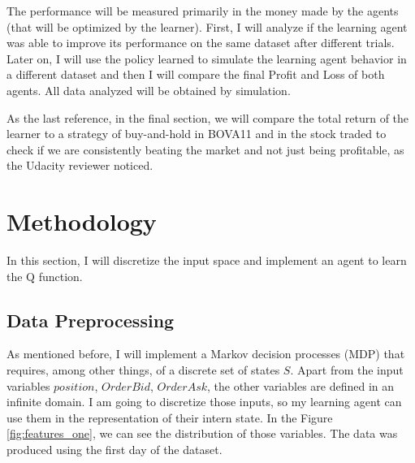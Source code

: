 \documentclass[a4paper]{article}
\begin{document}
The performance will be measured primarily in the money made by the agents (that will be optimized by the learner). First, I will analyze if the learning agent was able to improve its performance on the same dataset after different trials. Later on, I will use the policy learned to simulate the learning agent behavior in a different dataset and then I will compare the final Profit and Loss of both agents. All data analyzed will be obtained by simulation.

As the last reference, in the final section, we will compare the total return of the learner to a strategy of buy-and-hold in BOVA11 and in the stock traded to check if we are consistently beating the market and not just being profitable, as the Udacity reviewer noticed.


\section{Methodology}
\label{sec:methodology}

In this section, I will discretize the input space and implement an agent to learn the Q function.

\subsection{Data Preprocessing}
As mentioned before, I will implement a Markov decision processes (MDP) that requires, among other things, of a discrete set of states $S$. Apart from the input variables $position$, $OrderBid$, $OrderAsk$, the other variables are defined in an infinite domain. I am going to discretize those inputs, so my learning agent can use them in the representation of their intern state. In the Figure \ref{fig:features_one}, we can see the distribution of those variables. The data was produced using the first day of the dataset.
\end{document}
